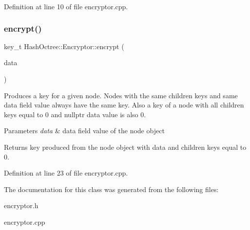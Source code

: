 Definition at line 10 of file encryptor.\+cpp.

\mbox{\label{class_hash_octree_1_1_encryptor_ac1fe3652c0462bd989d38f3ba316c258_ac1fe3652c0462bd989d38f3ba316c258}} 
\subsubsection{\texorpdfstring{encrypt()}{encrypt()}\hspace{0.1cm}{\footnotesize\ttfamily [3/3]}}
{\footnotesize\ttfamily key\+\_\+t Hash\+Octree\+::\+Encryptor\+::encrypt (\begin{DoxyParamCaption}\item[{const data\+\_\+t}]{data }\end{DoxyParamCaption})\hspace{0.3cm}{\ttfamily [static]}}

Produces a key for a given node. Nodes with the same children keys and same data field value always have the same key. Also a key of a node with all children keys equal to 0 and nullptr data value is also 0. 
\begin{DoxyParams}{Parameters}
{\em data} & data field value of the node object \\
\hline
\end{DoxyParams}
\begin{DoxyReturn}{Returns}
key produced from the node object with {\ttfamily data} and children keys equal to 0. 
\end{DoxyReturn}


Definition at line 23 of file encryptor.\+cpp.



The documentation for this class was generated from the following files\+:\begin{DoxyCompactItemize}
\item 
encryptor.\+h\item 
encryptor.\+cpp\end{DoxyCompactItemize}
